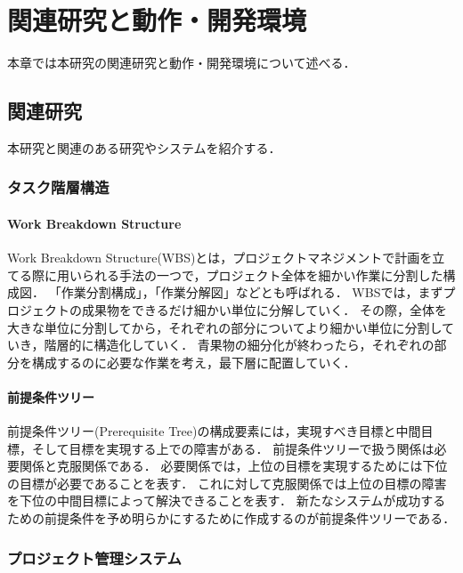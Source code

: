 \chapter{関連研究と動作・開発環境}
本章では本研究の関連研究と動作・開発環境について述べる．

\section{関連研究}
本研究と関連のある研究やシステムを紹介する．

\subsection{タスク階層構造}

\subsubsection{Work Breakdown Structure}
Work Breakdown Structure(WBS)とは，プロジェクトマネジメントで計画を立てる際に用いられる手法の一つで，プロジェクト全体を細かい作業に分割した構成図．
「作業分割構成」，「作業分解図」などとも呼ばれる．
WBSでは，まずプロジェクトの成果物をできるだけ細かい単位に分解していく．
その際，全体を大きな単位に分割してから，それぞれの部分についてより細かい単位に分割していき，階層的に構造化していく．
青果物の細分化が終わったら，それぞれの部分を構成するのに必要な作業を考え，最下層に配置していく．

\subsubsection{前提条件ツリー}
前提条件ツリー(Prerequisite Tree)\cite{zentei}の構成要素には，実現すべき目標と中間目標，そして目標を実現する上での障害がある．
前提条件ツリーで扱う関係は必要関係と克服関係である．
必要関係では，上位の目標を実現するためには下位の目標が必要であることを表す．
これに対して克服関係では上位の目標の障害を下位の中間目標によって解決できることを表す．
新たなシステムが成功するための前提条件を予め明らかにするために作成するのが前提条件ツリーである．

\subsection{プロジェクト管理システム}

